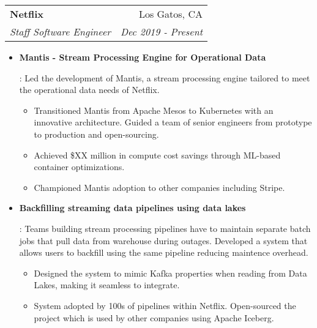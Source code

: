 \documentclass[letterpaper,11pt]{article}
\makeatletter
\newcommand{\resumeItem}[2]{
  \item\small{
    \textbf{#1}{: #2 \vspace{-2pt}}
  }
}
\newcommand{\resumeSubheading}[4]{
  \vspace{-1pt}\item
    \begin{tabular*}{0.97\textwidth}[t]{l@{\extracolsep{\fill}}r}
      \textbf{#1} & #2 \\
      \textit{\small#3} & \textit{\small #4} \\
    \end{tabular*}\vspace{-5pt}
}
\newcommand{\resumeSubSubheading}[2]{
    \begin{tabular*}{0.97\textwidth}{l@{\extracolsep{\fill}}r}
      \textit{\small#1} & \textit{\small #2} \\
    \end{tabular*}\vspace{-5pt}
}
\newcommand{\resumeItemListStart}{\begin{itemize}}
\newcommand{\resumeItemListEnd}{\end{itemize}}
\makeatother
\begin{document}
\resumeSubheading
{Netflix}{Los Gatos, CA}
{Staff Software Engineer}{Dec 2019 - Present}
\resumeItemListStart
\resumeItem{Mantis - Stream Processing Engine for Operational Data}
{
  Led the development of Mantis, a stream processing engine tailored to meet the operational data needs of Netflix.
  \begin{itemize}[label=\textbf{--}]
    \item
          Transitioned Mantis from Apache Mesos to Kubernetes with an innovative architecture.
          Guided a team of senior engineers from prototype to production and open-sourcing.
    \item
          Achieved \$XX million in compute cost savings through ML-based container optimizations.
    \item
          Championed Mantis adoption to other companies including Stripe.
  \end{itemize}
}
\resumeItem{Backfilling streaming data pipelines using data lakes}
{
  Teams building stream processing pipelines have to maintain separate batch jobs that pull data from warehouse during outages.
  Developed a system that allows users to backfill using the same pipeline reducing maintence overhead.
  \begin{itemize}[label=\textbf{--}]
    \item
          Designed the system to mimic Kafka properties when reading from Data Lakes, making it seamless to integrate.
    \item
          System adopted by 100s of pipelines within Netflix. Open-sourced the project which is used by other companies using Apache Iceberg.
  \end{itemize}
}
\resumeItemListEnd


\end{document}
